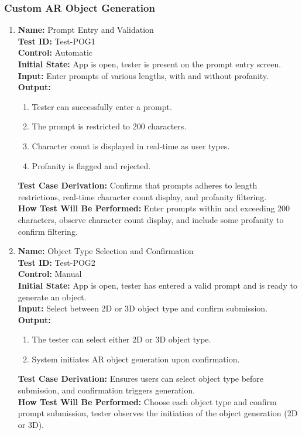 \documentclass[12pt, titlepage]{article}
\begin{document}
\subsubsection{Custom AR Object Generation}

\begin{enumerate}

  \item \textbf{Name:} Prompt Entry and Validation \label{itm:Test-POG1} \\
  \textbf{Test ID:} Test-POG1 \\
  \textbf{Control:} Automatic \\
  \textbf{Initial State:} App is open, tester is present on the prompt entry screen. \\
  \textbf{Input:} Enter prompts of various lengths, with and without profanity. \\
  \textbf{Output:}
      \begin{enumerate}
          \item Tester can successfully enter a prompt.
          \item The prompt is restricted to 200 characters.
          \item Character count is displayed in real-time as user types.
          \item Profanity is flagged and rejected.
      \end{enumerate}
  \textbf{Test Case Derivation:} Confirms that prompts adheres to length restrictions, real-time character count display, and profanity filtering. \\
  \textbf{How Test Will Be Performed:} Enter prompts within and exceeding 200 characters, observe character count display, and include some profanity to confirm filtering. \\

  \item \textbf{Name:} Object Type Selection and Confirmation \label{itm:Test-POG2} \\
  \textbf{Test ID:} Test-POG2 \\
  \textbf{Control:} Manual \\
  \textbf{Initial State:} App is open, tester has entered a valid prompt and is ready to generate an object. \\
  \textbf{Input:} Select between 2D or 3D object type and confirm submission. \\
  \textbf{Output:}
      \begin{enumerate}
          \item The tester can select either 2D or 3D object type.
          \item System initiates AR object generation upon confirmation.
      \end{enumerate}
  \textbf{Test Case Derivation:} Ensures users can select object type before submission, and confirmation triggers generation. \\
  \textbf{How Test Will Be Performed:} Choose each object type and confirm prompt submission, tester observes the initiation of the object generation (2D or 3D). \\


\end{enumerate}
\end{document}
